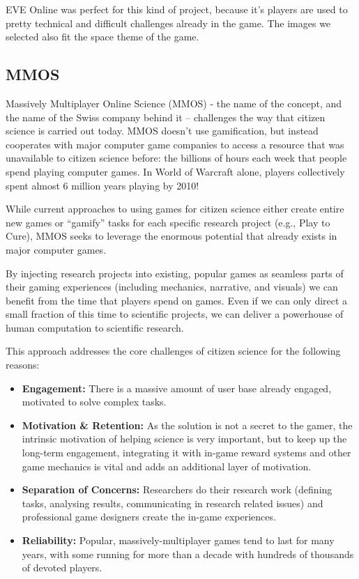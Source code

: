 	EVE Online was perfect for this kind of project, because it's players are used to pretty technical and difficult challenges already in the game. The images we selected also fit the space theme of the game.

\subsection{MMOS}

	Massively Multiplayer Online Science (MMOS) - the name of the concept, and the name of the Swiss company behind it – challenges the way that citizen science is	carried out today. MMOS doesn’t use gamification, but instead cooperates with major	computer game companies to access a resource that was unavailable to citizen science before: the billions of hours each week that people spend playing computer	games. In World of Warcraft alone, players collectively spent almost 6 million years playing by 2010!

	While current approaches to using games for citizen science either create entire new games or ``gamify'' tasks for each specific research project (e.g., Play to Cure), MMOS seeks to leverage the enormous potential that already exists in major computer games. 

	By injecting research projects into existing, popular games as seamless parts of their gaming experiences (including mechanics, narrative, and visuals) we can benefit from the time that players spend on games. Even if we can only direct a small fraction of this time to scientific projects, we can deliver a powerhouse of human computation to scientific research.

	This approach addresses the core challenges of citizen science for the following reasons:

	\begin{itemize}
	  \item {\bf Engagement:} There is a massive amount of user base already engaged, motivated to
	  solve complex tasks.
	  \item {\bf Motivation \& Retention:} As the solution is not a secret to the gamer, the intrinsic motivation of
	  helping science is very important, but to keep up the long-term engagement,
	  integrating it with in-game reward systems and other game mechanics is vital
	  and adds an additional layer of motivation.
	  \item {\bf Separation of Concerns:} Researchers do their research work
	  (defining tasks, analysing results, communicating in research related issues)
	  and professional game designers create the in-game experiences.
	  \item {\bf Reliability:} Popular, massively-multiplayer games tend to last for many years, with some running for more than a decade
	  with hundreds of thousands of devoted players.
	\end{itemize}

